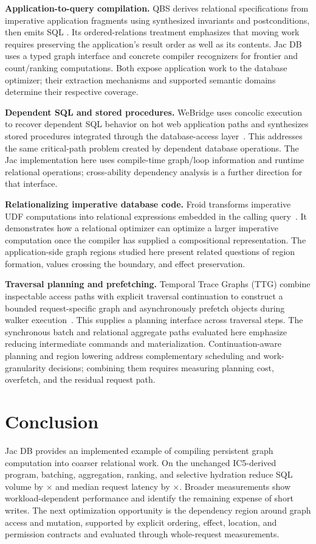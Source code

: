 \documentclass[sigconf,nonacm]{acmart}
\newcommand{\jacdb}{Jac DB}
\begin{document}
\textbf{Application-to-query compilation.}
QBS derives relational specifications from imperative application fragments
using synthesized invariants and postconditions, then emits SQL
\citep{qbs}. Its ordered-relations treatment emphasizes that moving work
requires preserving the application's result order as well as its contents.
\jacdb{} uses a typed graph interface and concrete compiler recognizers for
frontier and count/ranking computations. Both expose application work to the
database optimizer; their extraction mechanisms and supported semantic
domains determine their respective coverage.

\textbf{Dependent SQL and stored procedures.}
WeBridge uses concolic execution to recover dependent SQL behavior on hot web
application paths and synthesizes stored procedures integrated through the
database-access layer~\citep{webridge}. This addresses the same critical-path
problem created by dependent database operations. The Jac implementation here
uses compile-time graph/loop information and runtime relational operations;
cross-ability dependency analysis is a further direction for that interface.

\textbf{Relationalizing imperative database code.}
Froid transforms imperative UDF computations into relational expressions
embedded in the calling query~\citep{froid}. It demonstrates how a relational
optimizer can optimize a larger imperative computation once the compiler
has supplied a compositional representation. The application-side graph
regions studied here present related questions of region formation, values
crossing the boundary, and effect preservation.

\textbf{Traversal planning and prefetching.}
Temporal Trace Graphs (TTG) combine inspectable access paths with explicit
traversal continuation to construct a bounded request-specific graph and
asynchronously prefetch objects during walker execution~\citep{ttg}.
This supplies a planning interface across traversal steps. The synchronous
batch and relational aggregate paths evaluated here emphasize reducing
intermediate commands and materialization. Continuation-aware planning and
region lowering address complementary scheduling and work-granularity
decisions; combining them requires measuring planning cost, overfetch, and
the residual request path.

\section{Conclusion}
\jacdb{} provides an implemented example of compiling persistent graph
computation into coarser relational work. On the unchanged IC5-derived
program, batching, aggregation, ranking, and selective hydration reduce
SQL volume by \SQLReduction{}$\times$ and median request latency by
\LatencySpeedup{}$\times$. Broader measurements show workload-dependent
performance and identify the remaining expense of short writes. The next
optimization opportunity is the dependency region around graph access and
mutation, supported by explicit ordering, effect, location, and permission
contracts and evaluated through whole-request measurements.
\end{document}
